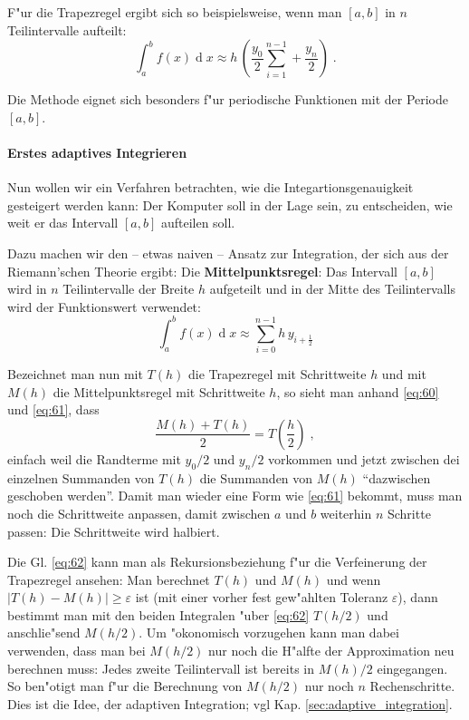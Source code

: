 \documentclass[a4paper]{book}
\newcommand{\diff}{\ensuremath{\operatorname d}}
\begin{document}
F"ur die Trapezregel ergibt sich so beispielsweise, wenn man $[a,b]$
in $n$ Teilintervalle aufteilt:
\begin{equation}
  \label{eq:60}
  \int_a^b f(x) \diff x 
\approx
h \, \left ( \frac{y_0}{2} \sum_{i=1}^{n-1} + \frac{y_n}{2} \right ) \;.
\end{equation}

Die Methode eignet sich besonders f"ur periodische Funktionen mit der
Periode $[a,b]$.




\paragraph{Erstes adaptives Integrieren}
\label{sec:erstes_adaptives_integrieren}


Nun wollen wir ein Verfahren betrachten, wie die
Integartionsgenauigkeit gesteigert werden kann: Der Komputer soll in
der Lage sein, zu entscheiden, wie weit er das Intervall $[a,b]$
aufteilen soll. 

Dazu machen wir den -- etwas naiven -- Ansatz zur Integration, der
sich aus der Riemann'schen Theorie ergibt: Die
\textbf{Mittelpunktsregel}: Das Intervall $[a,b]$ wird in $n$ Teilintervalle
der Breite $h$ aufgeteilt und in der Mitte des Teilintervalls wird der
Funktionswert verwendet:
\begin{equation}
  \label{eq:61}
  \int_a^b f(x) \diff x \approx
\sum_{i=0}^{n-1} h \, y_{i+\frac{1}{2}}
\end{equation}

Bezeichnet man nun mit $T(h)$ die Trapezregel mit Schrittweite $h$ und
mit $M(h)$ die Mittelpunktsregel mit Schrittweite $h$, so sieht man
anhand \eqref{eq:60} und \eqref{eq:61}, dass
\begin{equation}
  \label{eq:62}
  \frac{M(h) + T(h)} 2 = T(\frac{h}{2}) \;,
\end{equation}
einfach weil die Randterme mit $y_0/2$ und $y_n/2$ vorkommen und jetzt
zwischen dei einzelnen Summanden von $T(h)$ die Summanden von $M(h)$
"`dazwischen geschoben werden"'. Damit man wieder eine Form wie
\eqref{eq:61} bekommt, muss man noch die Schrittweite anpassen, damit
zwischen $a$ und $b$ weiterhin $n$ Schritte passen: Die Schrittweite
wird halbiert.

Die Gl. \eqref{eq:62} kann man als Rekursionsbeziehung f"ur die
Verfeinerung der Trapezregel ansehen: Man berechnet $T(h)$ und $M(h)$
und wenn $|T(h) - M(h)| \geq \varepsilon$ ist (mit einer vorher fest
gew"ahlten Toleranz $\varepsilon$), dann bestimmt man mit den beiden
Integralen "uber \eqref{eq:62} $T(h/2)$ und anschlie"send $M(h/2)$. Um
"okonomisch vorzugehen kann man dabei verwenden, dass man bei $M(h/2)$
nur noch die H"alfte der Approximation neu berechnen muss: Jedes
zweite Teilintervall ist bereits in $M(h)/2$ eingegangen. So ben"otigt
man f"ur die Berechnung von $M(h/2)$ nur noch $n$ Rechenschritte. Dies
ist die Idee, der adaptiven Integration; vgl
Kap. \ref{sec:adaptive_integration}.
\end{document}
